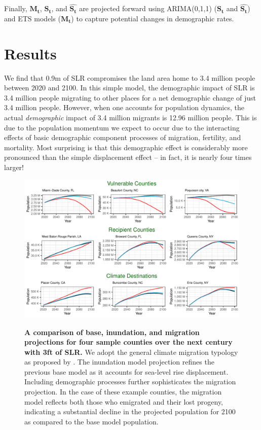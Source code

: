 \documentclass[9pt,twocolumn,twoside,]{pnas-new}
\begin{document}
Finally, \(\mathbf{M_t}\), \(\mathbf{S_t}\), and \(\mathbf{\hat{S_t}}\)
are projected forward using ARIMA(0,1,1) (\(\mathbf{S_t}\) and
\(\mathbf{\hat{S_t}}\)) and ETS models (\(\mathbf{M_t}\)) to capture
potential changes in demographic rates.

\hypertarget{results}{%
\section*{Results}\label{results}}

We find that 0.9m of SLR compromises the land area home to 3.4 million
people between 2020 and 2100. In this simple model, the demographic
impact of SLR is 3.4 million people migrating to other places for a net
demographic change of just 3.4 million people. However, when one
accounts for population dynamics, the actual \emph{demographic} impact
of 3.4 million migrants is 12.96 million people. This is due to the
population momentum we expect to occur due to the interacting effects of
basic demographic component processes of migration, fertility, and
mortality. Most surprising is that this demographic effect is
considerably more pronounced than the simple displacement effect -- in
fact, it is nearly four times larger!

\begin{figure}
\includegraphics{FigProjLines.pdf}\label{FigProjLines}
\caption{\textbf{A comparison of base, inundation, and migration projections for four sample counties over the next century with 3ft of SLR.} We adopt the general climate migration typology as proposed by \citep{marandi2021vulnerable}. The inundation model projection refines the previous base model as it accounts for sea-level rise displacement. Including demographic processes further sophisticates the migration projection. In the case of these example counties, the migration model reflects both those who emigrated and their lost progeny, indicating a substantial decline in the projected population for 2100 as compared to the base model population.}
\end{figure}
\end{document}
